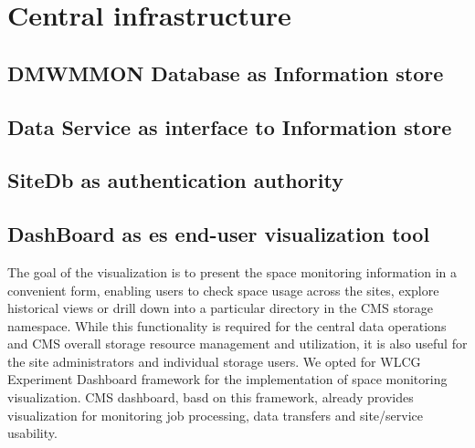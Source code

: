 \section {Central infrastructure}


\subsection {DMWMMON Database as Information store}


\subsection {Data Service as interface to Information store}

\subsection {SiteDb as authentication authority}



\subsection {DashBoard as es end-user visualization tool}

The goal of the visualization is to present the space monitoring information 
in a convenient form, enabling users to check space usage across the sites, 
explore historical views or drill down into a particular directory in the 
CMS storage namespace. While this functionality is required for the central data 
operations and CMS overall storage resource management and utilization, it is
also useful for the site administrators and individual storage users. We opted 
for WLCG Experiment Dashboard \cite{ExpDashboard} framework for the
implementation of space monitoring visualization. CMS dashboard, basd on this 
framework, already provides visualization for monitoring job processing, data 
transfers and site/service usability.

